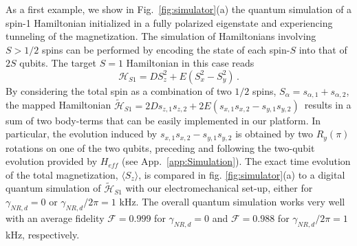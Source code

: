 \documentclass[aps,twocolumn,groupedaddress,superscriptaddress,floatfix,amsmath,amssymb,prb]{revtex4-1}
\begin{document}
As a first example, we show in Fig.~\ref{fig:simulator}(a) the quantum simulation of a spin-1 Hamiltonian initialized in a fully polarized eigenstate and experiencing tunneling of the magnetization. %
The simulation of Hamiltonians involving $S>1/2$ spins can be performed by encoding the state of each spin-$S$ into that of $2S$ qubits.
The target $S=1$ Hamiltonian in this case reads
\begin{equation}
\mathcal{H}_{S1} = D S_z^2 + E (S_x^2 - S_y^2 ) \, .
\label{eq:HS1}
\end{equation}
By considering the total spin as a combination of two $1/2$ spins, $S_{\alpha}=s_{\alpha,1}+s_{\alpha,2}$, the mapped Hamiltonian 
$\tilde{\mathcal{H}}_{S1} = 2D s_{z,1}s_{z,2} + 2E (s_{x,1}s_{x,2}  - s_{y,1} s_{y,2}) \, $ results in a sum of two body-terms that can be easily implemented in our platform. In particular, the evolution induced by $s_{x,1}s_{x,2}  - s_{y,1} s_{y,2}$ is obtained by two $R_y(\pi)$ rotations on one of the two qubits, preceding and following the two-qubit evolution provided by $H_{eff}$ (see App.~\ref{app:Simulation}).
The exact time evolution of the total magnetization, $\langle S_z \rangle$, is compared in fig. \ref{fig:simulator}(a) to a digital quantum simulation of $\tilde{\mathcal{H}}_{S1}$ with our electromechanical set-up, either for $\gamma_{NR,d} =0$ or $\gamma_{NR,d}/ 2\pi =1$ kHz. The overall quantum simulation works very well with an average fidelity $\mathcal{F}=0.999$ for $\gamma_{NR,d} =0$ and $\mathcal{F}=0.988$ for $\gamma_{NR,d}/ 2\pi =1$ kHz, respectively. 
\end{document}
